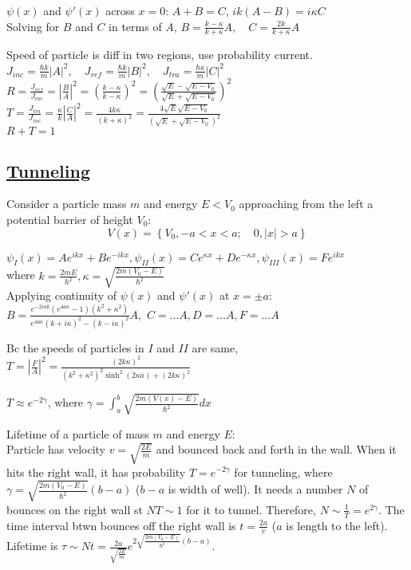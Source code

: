 $\psi(x)$ and $\psi'(x)$ across $x = 0$: $A+B=C$, $ik(A-B) = i \kappa C$ \\
Solving for $B$ and $C$ in terms of $A$, $B= \frac{k - \kappa}{k + \kappa} A, \quad C = \frac{2k}{k + \kappa} A$

Speed of particle is diff in two regions, use probability current. \\
$J_{inc} = \frac{\hbar k}{m} |A|^2, \quad J_{ref} = \frac{\hbar k}{m} |B|^2, \quad J_{tra} = \frac{\hbar \kappa}{m} |C|^2$ \\

$R = \frac{J_{ref}}{J_{inc}} = |\frac{B}{A}|^2 = (\frac{k - \kappa}{k - \kappa})^2 = (\frac{\sqrt{E} - \sqrt{E - V_0}}{\sqrt{E} + \sqrt{E - V_0}})^2$ \\
$T = \frac{J_{tra}}{J_{inc}} = \frac{\kappa}{k} |\frac{C}{A}|^2 = \frac{4k \kappa}{(k+\kappa)^2} = \frac{4 \sqrt{E} \sqrt{E - V_0}}{(\sqrt{E} + \sqrt{E - V_0})^2}$ \\
$R + T = 1$

\subsection{\underline{Tunneling}}
Consider a particle mass $m$ and energy $E < V_0$ approaching from the left a potential barrier of height $V_0$:
$$V(x) = \left\{ V_0, -a < x < a; \quad 0, |x| > a \right\}$$

$\psi_{I}(x) = Ae^{ikx} + Be^{-ikx}, \psi_{II}(x) = Ce^{\kappa x} + De^{-\kappa x}, \psi_{III}(x) = Fe^{ikx}$ \\
where $k = \frac{2mE}{\hbar^2}, \kappa = \sqrt{\frac{2m(V_0 - E)}{\hbar^2}}$ \\

Applying continuity of $\psi(x)$ and $\psi'(x)$ at $x = \pm a$:
    $B = \frac{e^{-2iak}(e^{4a\kappa} - 1)(k^2 + \kappa^2)}{e^{4a\kappa} (k + i\kappa)^2 - (k - i \kappa)^2} A,$
    $C = ...A, D = ... A, F = ...A$

Bc the speeds of particles in $I$ and $II$ are same, $T = |\frac{F}{A}|^2 = \frac{(2 k \kappa)^2}{(k^2 + \kappa^2)^2 \sinh^2(2\kappa a) + (2 k \kappa)^2}$

$T \approx e^{-2 \gamma}$, where $\gamma = \int_{a}^{b} \sqrt{\frac{2m (V(x) - E)}{\hbar^2}} dx$

Lifetime of a particle of mass $m$ and energy $E$: \\
Particle has velocity $v = \sqrt{\frac{2E}{m}}$ and bounced back and forth in the wall. When it hits the right wall, it has probability $T=e^{-2\gamma}$ for tunneling, where $\gamma = \sqrt{\frac{2m(V_0 - E)}{\hbar^2}}(b-a)$ ($b-a$ is width of well). It needs a number $N$ of bounces on the right wall st $NT \sim 1$ for it to tunnel. Therefore, $N \sim \frac{1}{T} = e^{2\gamma}$. The time interval btwn bounces off the right wall is $t = \frac{2a}{v}$ ($a$ is length to the left). Lifetime is $\tau \sim Nt = \frac{2a}{\sqrt{\frac{2E}{m}}} e^{2 \sqrt{\frac{2m(V_0 - E)}{\hbar^2}} (b-a)}$.

